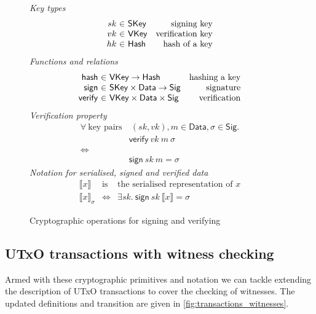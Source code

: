 \documentclass[11pt,a4paper]{article}
\newcommand{\var}[1]{\mathit{#1}}
\newcommand{\fun}[1]{\mathsf{#1}}
\newcommand{\type}[1]{\mathsf{#1}}
\newcommand{\serialised}[1]{\llbracket #1 \rrbracket}
\newcommand{\signed}[2]{\llbracket #1 \rrbracket_{#2}}
\begin{document}
\begin{figure}

\emph{Key types}
%
\begin{equation*}
\begin{array}{r@{~\in~}lr}
  sk
& \type{SKey}
& \text{signing key}
\\
  vk
& \type{VKey}
& \text{verification key}
\\
  hk
& \type{Hash}
& \text{hash of a key}
\end{array}
\end{equation*}
%
\emph{Functions and relations}
%
\begin{equation*}
\begin{array}{r@{~\in~}lr}
  \fun{hash} & \type{VKey} \to \type{Hash}
& \text{hashing a key}
\\
  \fun{sign} & \type{SKey} \times \type{Data} \to \type{Sig}
& \text{signature}
\\
  \fun{verify} & \type{VKey} \times \type{Data} \times \type{Sig}
& \text{verification}
\end{array}
\end{equation*}
%
\emph{Verification property}
%
\begin{align*}
\forall ~ \text{key pairs} & ~ (sk, vk), m \in \type{Data}, \sigma \in \type{Sig}. \\
     & \fun{verify} ~ \var{vk} ~ m ~ \sigma \\
\iff & \\
     & \fun{sign} ~ \var{sk} ~ m = \sigma
\end{align*}
%
\emph{Notation for serialised, signed and verified data}
%
\begin{equation*}
\begin{array}{lcl}
  \serialised{x}
& \text{is}
& \text{the serialised representation of } x
\\[0.2em]
  \signed{x}{\sigma}
& \iff
& \exists \var{sk}. ~ \fun{sign} ~ sk ~ \serialised{x} = \sigma
\end{array}
\end{equation*}

\caption{Cryptographic operations for signing and verifying}
\label{fig:crypto}
\end{figure}

\subsection{UTxO transactions with witness checking}

Armed with these cryptographic primitives and notation we can tackle extending
the description of UTxO transactions to cover the checking of witnesses. The
updated definitions and transition are given in \cref{fig:transactions_witnesses}.
\end{document}
